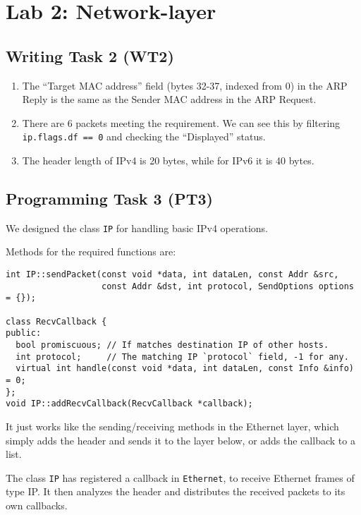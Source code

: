 \documentclass[a4paper]{article}
\begin{document}
  \section{Lab 2: Network-layer}

  \subsection{Writing Task 2 (WT2)}

  \begin{enumerate}
    \item The ``Target MAC address'' field (bytes 32-37, indexed from 0) in the ARP Reply is the same as the Sender MAC address in the ARP Request.
    \item There are 6 packets meeting the requirement. We can see this by filtering \texttt{ip.flags.df == 0} and checking the ``Displayed'' status.
    \item The header length of IPv4 is 20 bytes, while for IPv6 it is 40 bytes.
  \end{enumerate}

  \subsection{Programming Task 3 (PT3)}

  We designed the class \texttt{IP} for handling basic IPv4 operations.

  Methods for the required functions are:
  \begin{verbatim}
int IP::sendPacket(const void *data, int dataLen, const Addr &src,
                   const Addr &dst, int protocol, SendOptions options = {});

class RecvCallback {
public:
  bool promiscuous; // If matches destination IP of other hosts.
  int protocol;     // The matching IP `protocol` field, -1 for any.
  virtual int handle(const void *data, int dataLen, const Info &info) = 0;
};
void IP::addRecvCallback(RecvCallback *callback);
  \end{verbatim}

  It just works like the sending/receiving methods in the Ethernet layer, which simply adds the header and sends it to the layer below, or adds the callback to a list.

  The class \texttt{IP} has registered a callback in \texttt{Ethernet}, to receive Ethernet frames of type IP.
  It then analyzes the header and distributes the received packets to its own callbacks.
\end{document}
